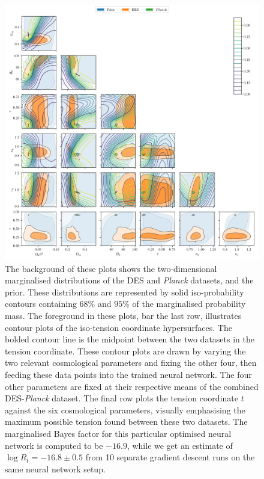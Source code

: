 \documentclass[%
 reprint,
 amsmath,amssymb,
 aps,
]{revtex4-2}
\begin{document}
\begin{figure}
    \includegraphics[width=\textwidth]{../plots/six.png}
    \centering
    \caption{The background of these plots shows the two-dimensional marginalised distributions of the DES and \textit{Planck} datasets, and the prior. These distributions are represented by solid iso-probability contours containing $68\%$ and $95\%$ of the marginalised probability mass. The foreground in these plots, bar the last row, illustrates contour plots of the iso-tension coordinate hypersurfaces. The bolded contour line is the midpoint between the two datasets in the tension coordinate. These contour plots are drawn by varying the two relevant cosmological parameters and fixing the other four, then feeding these data points into the trained neural network. The four other parameters are fixed at their respective means of the combined DES-\textit{Planck} dataset. The final row plots the tension coordinate $t$ against the six cosmological parameters, visually emphasising the maximum possible tension found between these two datasets. The marginalised Bayes factor for this particular optimised neural network is computed to be $-16.9$, while we get an estimate of $\log R_t = -16.8 \pm 0.5$ from 10 separate gradient descent runs on the same neural network setup.}
    \label{fig:six}
\end{figure}
\end{document}
